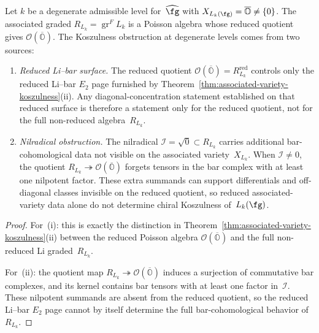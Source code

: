 \begin{proposition}
\label{prop:large-orbit-obstruction}

Let $k$ be a degenerate admissible level for~$\widehat{\fg}$
with $X_{L_k(\fg)} = \overline{\mathbb{O}} \neq \{0\}$.
The associated graded $R_{L_k} = \operatorname{gr}^F L_k$
is a Poisson algebra whose reduced quotient gives
$\mathcal{O}(\overline{\mathbb{O}})$. The Koszulness
obstruction at degenerate levels comes from two sources:
\begin{enumerate}[label=\textup{(\roman*)}]
\item \emph{Reduced Li--bar surface.}
 The reduced quotient
 $\mathcal{O}(\overline{\mathbb{O}})=R_{L_k}^{\mathrm{red}}$
 controls only the reduced Li--bar $E_2$ page furnished by
 Theorem~\ref{thm:associated-variety-koszulness}(ii). Any
 diagonal-concentration statement established on that reduced
 surface is therefore a statement only for the reduced quotient,
 not for the full non-reduced algebra~$R_{L_k}$.
\item \emph{Nilradical obstruction.}
 The nilradical $\mathcal{I} = \sqrt{0} \subset R_{L_k}$
 carries additional bar-cohomological data not visible
 on the associated variety~$X_{L_k}$. When
 $\mathcal{I} \neq 0$, the quotient
 $R_{L_k} \twoheadrightarrow
 \mathcal{O}(\overline{\mathbb{O}})$ forgets tensors in the
 bar complex with at least one nilpotent factor. These extra
 summands can support differentials and off-diagonal classes
 invisible on the reduced quotient, so reduced associated-variety
 data alone do not determine chiral Koszulness of~$L_k(\fg)$.
\end{enumerate}
\end{proposition}

\begin{proof}
For~(i): this is exactly the distinction in
Theorem~\ref{thm:associated-variety-koszulness}(ii) between the
reduced Poisson algebra
$\mathcal{O}(\overline{\mathbb{O}})$ and the full
non-reduced Li graded~$R_{L_k}$.

For~(ii): the quotient map
$R_{L_k} \twoheadrightarrow
\mathcal{O}(\overline{\mathbb{O}})$ induces a surjection of
commutative bar complexes, and its kernel contains bar tensors
with at least one factor in~$\mathcal{I}$. These nilpotent
summands are absent from the reduced quotient, so the reduced
Li--bar $E_2$ page cannot by itself determine the full
bar-cohomological behavior of~$R_{L_k}$.
\end{proof}

